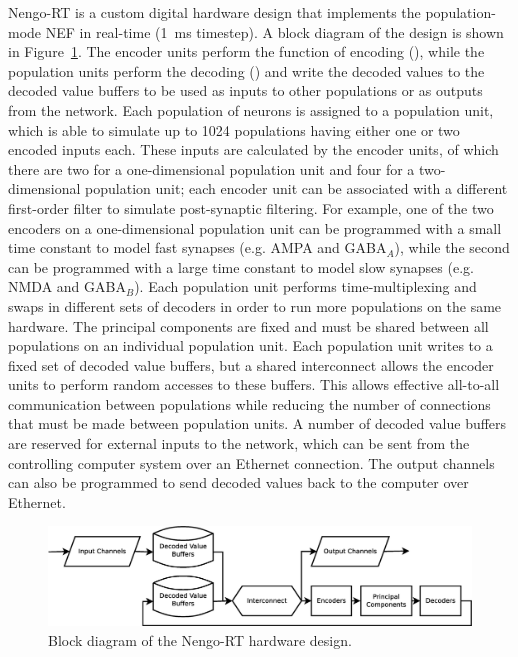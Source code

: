\documentclass[english]{article}
\newcommand{\design}{Nengo-RT}
\begin{document}
\design{} is a custom digital hardware design that implements the population-mode NEF in real-time (1~ms timestep).
A block diagram of the design is shown in Figure~\ref{fig:system}.
The encoder units perform the function of encoding (), %
while the population units perform the decoding () %
and write the decoded values to the decoded value buffers
to be used as inputs to other populations or as outputs from the network.
Each population of neurons is assigned to a population unit, which is able to simulate up to 1024 populations
having either one or two encoded inputs each. These inputs are calculated by the encoder units,
of which there are two for a one-dimensional population unit and four for a two-dimensional population unit;
each encoder unit can be associated with a different first-order filter to simulate post-synaptic filtering.
For example, one of the two encoders on a one-dimensional population unit can be programmed with
a small time constant to model fast synapses (e.g. AMPA and GABA$_A$), while the second can be programmed
with a large time constant to model slow synapses (e.g. NMDA and GABA$_B$).
Each population unit performs time-multiplexing and swaps in different sets of decoders
in order to run more populations on the same hardware. The principal components are fixed and must be shared
between all populations on an individual population unit.
Each population unit writes to a fixed set of decoded value buffers, but a shared interconnect
allows the encoder units to perform random accesses to these buffers.
This allows effective all-to-all communication between populations while reducing the number of 
connections that must be made between population units.
A number of decoded value buffers are reserved for external inputs to the network,
which can be sent from the controlling computer system over an Ethernet connection.
The output channels can also be programmed to send decoded values back to the computer over Ethernet.

\begin{figure}
\centering

\includegraphics[width=6in]{system-block-diagram.eps}

\caption{Block diagram of the \design{} hardware design.}

\label{fig:system}
\end{figure}
\end{document}
